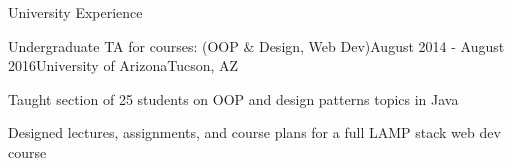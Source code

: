\documentclass{resume} %
\begin{document}
\begin{rSection}{University Experience}
	
	\begin{rSubsection}{Undergraduate TA for courses: (OOP \& Design, Web Dev)}{August 2014 - August 2016}{University of Arizona}{Tucson, AZ}
		\item Taught section of 25 students on OOP and design patterns topics in Java
		\item Designed lectures, assignments, and course plans for a full LAMP stack web dev course
	\end{rSubsection}

\end{rSection}

\end{document}
